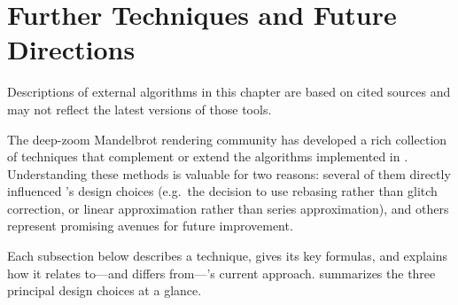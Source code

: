 
\section{Further Techniques and Future Directions}%
\label{sec:future-directions}

Descriptions of external algorithms in this chapter are based on cited
sources and may not reflect the latest versions of those tools.

The deep-zoom Mandelbrot rendering community has developed a rich
collection of techniques that complement or extend the algorithms
implemented in \FractalShark{}.  Understanding these methods is valuable
for two reasons: several of them directly influenced \FractalShark{}'s
design choices (e.g.\ the decision to use rebasing rather than
glitch correction, or linear approximation rather than series
approximation), and others represent promising avenues for future
improvement.

Each subsection below describes a technique, gives its key formulas, and
explains how it relates to---and differs from---\FractalShark{}'s current
approach.   summarizes the three principal
design choices at a glance.

